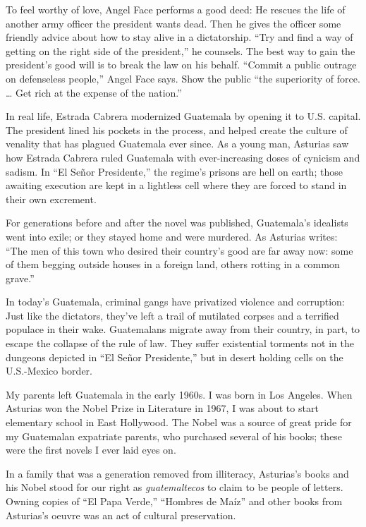 To feel worthy of love, Angel Face performs a good deed: He rescues the
life of another army officer the president wants dead. Then he gives the
officer some friendly advice about how to stay alive in a dictatorship.
``Try and find a way of getting on the right side of the president,'' he
counsels. The best way to gain the president's good will is to break the
law on his behalf. ``Commit a public outrage on defenseless people,''
Angel Face says. Show the public ``the superiority of force. \ldots{}
Get rich at the expense of the nation.''

In real life, Estrada Cabrera modernized Guatemala by opening it to U.S.
capital. The president lined his pockets in the process, and helped
create the culture of venality that has plagued Guatemala ever since. As
a young man, Asturias saw how Estrada Cabrera ruled Guatemala with
ever-increasing doses of cynicism and sadism. In ``El Señor
Presidente,'' the regime's prisons are hell on earth; those awaiting
execution are kept in a lightless cell where they are forced to stand in
their own excrement.

For generations before and after the novel was published, Guatemala's
idealists went into exile; or they stayed home and were murdered. As
Asturias writes: ``The men of this town who desired their country's good
are far away now: some of them begging outside houses in a foreign land,
others rotting in a common grave.''

In today's Guatemala, criminal gangs have privatized violence and
corruption: Just like the dictators, they've left a trail of mutilated
corpses and a terrified populace in their wake. Guatemalans migrate away
from their country, in part, to escape the collapse of the rule of law.
They suffer existential torments not in the dungeons depicted in ``El
Señor Presidente,'' but in desert holding cells on the U.S.-Mexico
border.

My parents left Guatemala in the early 1960s. I was born in Los Angeles.
When Asturias won the Nobel Prize in Literature in 1967, I was about to
start elementary school in East Hollywood. The Nobel was a source of
great pride for my Guatemalan expatriate parents, who purchased several
of his books; these were the first novels I ever laid eyes on.

In a family that was a generation removed from illiteracy, Asturias's
books and his Nobel stood for our right as \emph{guatemaltecos} to claim
to be people of letters. Owning copies of ``El Papa Verde,'' ``Hombres
de Maíz'' and other books from Asturias's oeuvre was an act of cultural
preservation.

